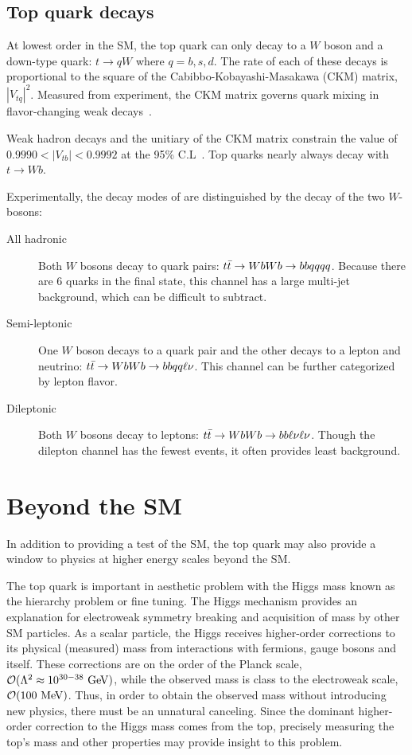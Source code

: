 \subsection{Top quark decays}
At lowest order in the SM, the top quark can only decay to a $W$ boson and a down-type quark: $t \rightarrow qW$ where $q=b,s,d$. The rate of each of these decays is proportional to the square of the Cabibbo-Kobayashi-Masakawa (CKM) matrix, $|V_{tq}|^2$. Measured from experiment, the CKM matrix governs quark mixing in flavor-changing weak decays~\cite{PDG}.

Weak hadron decays and the unitiary of the CKM matrix constrain the value of $0.9990 < |V_{tb}| < 0.9992$ at the 95\% C.L~\cite{Chetyrkin:1999ys}. Top quarks nearly always decay with $t \rightarrow Wb$.

Experimentally, the decay modes of \ttbar are distinguished by the decay of the two $W$-bosons:
\begin{description}
\item[All hadronic] Both $W$ bosons decay to quark pairs: $t\bar{t} \rightarrow WbWb \rightarrow bbqqqq$. Because there are 6 quarks in the final state, this channel has a large multi-jet background, which can be difficult to subtract. 

\item[Semi-leptonic] One $W$ boson decays to a quark pair and the other decays to a lepton and neutrino: $t\bar{t} \rightarrow WbWb \rightarrow bbqq \ell \nu$. This channel can be further categorized by lepton flavor.


\item[Dileptonic] Both $W$ bosons decay to leptons: $t\bar{t} \rightarrow WbWb \rightarrow bb\ell \nu\ell \nu$. Though the dilepton channel has the fewest events, it often provides least background.


\end{description} 

\section{Beyond the SM}
In addition to providing a test of the SM, the top quark may also provide a window to physics at higher energy scales beyond the SM.

The top quark is important in aesthetic problem with the Higgs mass known as the hierarchy problem or fine tuning. The Higgs mechanism provides an explanation for electroweak symmetry breaking and acquisition of mass by other SM particles. As a scalar particle, the Higgs receives higher-order corrections to its physical (measured) mass from interactions with fermions, gauge bosons and itself. These corrections are on the order of the Planck scale, $\mathcal{O}(\Lambda^2 \approx 10^{30-38} \gev)$, while the observed mass is class to the electroweak scale, $\mathcal{O}(100 \mev)$. Thus, in order to obtain the observed mass without introducing new physics, there must be an unnatural canceling. Since the dominant higher-order correction to the Higgs mass comes from the top, precisely measuring the top's mass and other properties may provide insight to this problem. 

